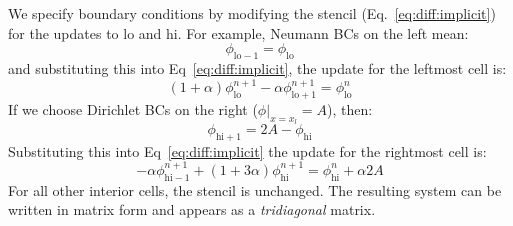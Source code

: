We specify boundary conditions by modifying the stencil (Eq.~\ref{eq:diff:implicit})
for the updates to $\mathrm{lo}$ and $\mathrm{hi}$.  For example, Neumann BCs on the left mean:
\begin{equation}
\phi_\mathrm{lo-1} = \phi_\mathrm{lo}
\end{equation}
and substituting this into Eq~\ref{eq:diff:implicit}, the update for the leftmost cell is:
\begin{equation}
 (1 + \alpha) \phi_\mathrm{lo}^{n+1} -\alpha \phi_\mathrm{lo+1}^{n+1}  = 
  \phi_\mathrm{lo}^n
\end{equation}
If we choose Dirichlet BCs on the right ($\phi |_{x=x_l} = A$), then:
\begin{equation}
\phi_\mathrm{hi+1} = 2 A - \phi_\mathrm{hi}
\end{equation}
Substituting this into Eq~\ref{eq:diff:implicit} the update for the rightmost cell is:
\begin{equation}
- \alpha \phi_\mathrm{hi-1}^{n+1} + (1 + 3\alpha) \phi_\mathrm{hi}^{n+1}  =
  \phi_\mathrm{hi}^n + \alpha 2 A
\end{equation}
For all other interior cells, the stencil is unchanged.  The resulting
system can be written in matrix form and appears as a {\em tridiagonal}
matrix.  
